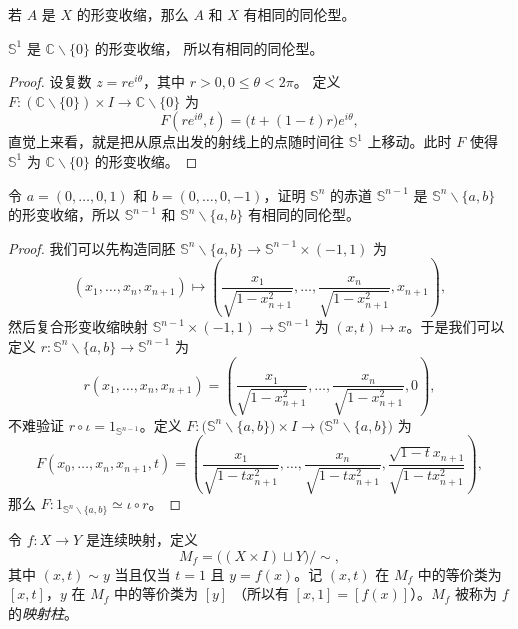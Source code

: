\documentclass[fontset=none]{Notes}
\begin{document}
\begin{theorem}
  若 $A$ 是 $X$ 的形变收缩，那么 $A$ 和 $X$ 有相同的同伦型。
\end{theorem}

\begin{corollary}
  $\mathbb{S}^1$ 是 $\mathbb{C}\smallsetminus\{0\}$ 的形变收缩，
  所以有相同的同伦型。
\end{corollary}
\begin{proof}
  设复数 $z=re^{i\theta}$，其中 $r>0,0\leq \theta<2\pi$。
  定义 $F:(\mathbb{C}\smallsetminus\{0\})\times I\to \mathbb{C}\smallsetminus\{0\}$
  为
  \[
    F(re^{i\theta},t)=\bigl(t+(1-t)r\bigr)e^{i\theta},
  \]
  直觉上来看，就是把从原点出发的射线上的点随时间往 $\mathbb{S}^1$
  上移动。此时 $F$ 使得 $\mathbb{S}^1$ 为 $\mathbb{C}\smallsetminus\{0\}$
  的形变收缩。
\end{proof}

\begin{problem}{}{}
  令 $a=(0,\dots,0,1)$ 和 $b=(0,\dots,0,-1)$，证明 
  $\mathbb{S}^n$ 的赤道 $\mathbb{S}^{n-1}$ 是 $\mathbb{S}^n \smallsetminus\{a,b\}$
  的形变收缩，所以 $\mathbb{S}^{n-1}$ 和 $\mathbb{S}^n \smallsetminus\{a,b\}$
  有相同的同伦型。
\end{problem}
\begin{proof}
  我们可以先构造同胚 $\mathbb{S}^n \smallsetminus\{a,b\}\to \mathbb{S}^{n-1}\times (-1,1)$
  为
  \[
    (x_1,\dots,x_n,x_{n+1})\mapsto 
    \left(\frac{x_1}{\sqrt{1-x_{n+1}^2}},\dots,\frac{x_n}{\sqrt{1-x_{n+1}^2}},x_{n+1}\right),
  \]
  然后复合形变收缩映射 $\mathbb{S}^{n-1}\times (-1,1)\to \mathbb{S}^{n-1}$
  为 $(x,t)\mapsto x$。于是我们可以定义 $r: \mathbb{S}^n \smallsetminus\{a,b\}\to \mathbb{S}^{n-1}$
  为
  \[
    r(x_1,\dots,x_n,x_{n+1})=
    \left(\frac{x_1}{\sqrt{1-x_{n+1}^2}},\dots,\frac{x_n}{\sqrt{1-x_{n+1}^2}},0\right),
  \]
  不难验证 $r\circ\iota=1_{\mathbb{S}^{n-1}}$。定义
  $F:\bigl(\mathbb{S}^n \smallsetminus\{a,b\}\bigr)\times I\to \bigl(\mathbb{S}^n \smallsetminus\{a,b\}\bigr)$
  为
  \[
    F(x_0,\dots,x_n,x_{n+1},t)=
    \left(\frac{x_1}{\sqrt{1-tx_{n+1}^2}},\dots,\frac{x_n}{\sqrt{1-tx_{n+1}^2}},\frac{\sqrt{1-t}x_{n+1}}{\sqrt{1-tx_{n+1}^2}}\right),
  \]
  那么 $F:1_{\mathbb{S}^n \smallsetminus\{a,b\}}\simeq \iota\circ r$。
\end{proof}

\begin{definition}
  令 $f:X\to Y$ 是连续映射，定义
  \[
    M_f=\bigl((X\times I)\sqcup Y\bigr)/\sim,
  \]
  其中 $(x,t)\sim y$ 当且仅当 $t=1$ 且 $y=f(x)$。记 $(x,t)$ 在 $M_f$
  中的等价类为 $[x,t]$，$y$ 在 $M_f$ 中的等价类为 $[y]$
  （所以有 $[x,1]=[f(x)]$）。$M_f$ 被称为 $f$ 的\emph{映射柱}。
\end{definition}
\end{document}
